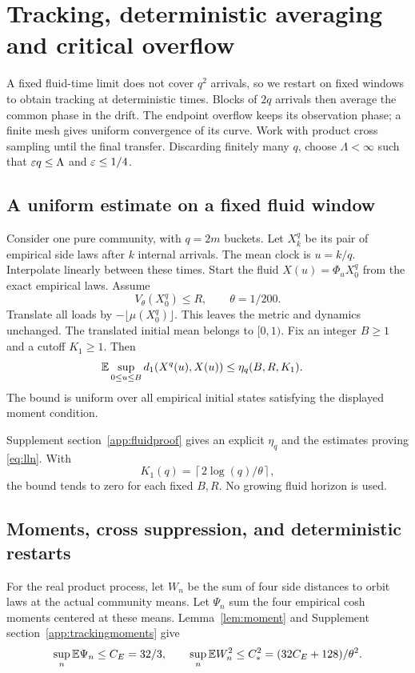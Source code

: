\section{Tracking, deterministic averaging and critical overflow}\label{sec:limit}
A fixed fluid-time limit does not cover $q^2$ arrivals, so we restart on fixed
windows to obtain tracking at deterministic times. Blocks of $2q$ arrivals
then average the common phase in the drift. The endpoint overflow keeps its
observation phase; a finite mesh gives uniform convergence of its curve.
Work with product cross sampling until the final transfer.
Discarding finitely many $q$, choose $\Lambda<\infty$ such that
$\varepsilon q\le\Lambda$ and $\varepsilon\le1/4$.

\subsection{A uniform estimate on a fixed fluid window}
Consider one pure community, with $q=2m$ buckets. Let $X_k^q$ be its pair of empirical side laws after $k$ internal arrivals. The mean clock is $u=k/q$. Interpolate linearly between these times. Start the fluid $X(u)=\Phi_uX_0^q$ from the exact empirical laws. Assume
\[
 V_\theta(X_0^q)\le R,\qquad \theta=1/200.
\]
Translate all loads by $-\lfloor\mu(X_0^q)\rfloor$. This leaves the metric and dynamics unchanged. The translated initial mean belongs to $[0,1)$. Fix an integer $B\ge1$ and a cutoff $K_1\ge1$. Then
\begin{align}
 \mathbb E\sup_{0\le u\le B}d_1(X^q(u),X(u))
 &\le\eta_q(B,R,K_1).\label{eq:lln}
\end{align}
The bound is uniform over all empirical initial states satisfying the displayed moment condition.

Supplement section~\ref*{app:fluidproof} gives an explicit $\eta_q$ and the estimates proving \eqref{eq:lln}. With
\[
 K_1(q)=\left\lceil2\log(q)/\theta\right\rceil,
\]
the bound tends to zero for each fixed $B,R$. No growing fluid horizon is used.

\subsection{Moments, cross suppression, and deterministic restarts}
For the real product process, let $W_n$ be the sum of four side distances to
orbit laws at the actual community means. Let $\Psi_n$ sum the four empirical
cosh moments centered at these means. Lemma~\ref{lem:moment} and Supplement
section~\ref*{app:trackingmoments} give
\begin{equation}\label{eq:trackingmoment}
 \sup_n\mathbb E\Psi_n\le C_E=32/3,\qquad
 \sup_n\mathbb E W_n^2\le C_*^2=(32C_E+128)/\theta^2.
\end{equation}

